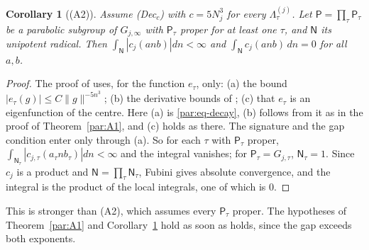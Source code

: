 \documentclass[10pt]{amsart}
\newtheorem{corollary}[theorem]{Corollary}
\theoremstyle{definition}
\theoremstyle{remark}
\begin{document}
\begin{corollary}[(A2)]\label{par:A2}
Assume \textup{(Dec$_c$)} with $c=5N_j^3$ for every $\Lambda^{(j)}_\tau$. Let $\mathsf P=\prod_\tau
\mathsf P_\tau$ be a parabolic subgroup of $G_{j,\infty}$ with $\mathsf P_\tau$ proper for at least
one $\tau$, and $\mathsf N$ its unipotent radical. Then $\int_{\mathsf N}|c_j(anb)|dn<\infty$ and
$\int_{\mathsf N}c_j(anb)\,dn=0$ for all $a,b$.
\end{corollary}
\begin{proof}
The proof of {\cite[Lemma~4.8]{P51}} uses, for the function $e_\tau$, only: (a) the bound
$|e_\tau(g)|\le C\|g\|^{-5n^3}$; (b) the derivative bounds of {\cite[Lemma~4.7(b)]{P51}}; (c) that
$e_\tau$ is an eigenfunction of the centre. Here (a) is \eqref{par:eq-decay}, (b) follows from it as
in the proof of Theorem~\ref{par:A1}, and (c) holds as there. The signature and the gap condition
{\cite[(41)]{P51}} enter {\cite[Lemma~4.8]{P51}} only through (a). So for each $\tau$ with $\mathsf
P_\tau$ proper, $\int_{\mathsf N_\tau}|c_{j,\tau}(a_\tau nb_\tau)|dn<\infty$ and the integral vanishes;
for $\mathsf P_\tau=G_{j,\tau}$, $\mathsf N_\tau=1$. Since $c_j$ is a product and $\mathsf
N=\prod_\tau\mathsf N_\tau$, Fubini gives absolute convergence, and the integral is the product of
the local integrals, one of which is $0$.
\end{proof}
This is stronger than (A2), which assumes every $\mathsf P_\tau$ proper. The hypotheses of
Theorem~\ref{par:A1} and Corollary~\ref{par:A2} hold as soon as {\cite[(59)]{P51}} holds, since the gap
exceeds both exponents.
\end{document}
